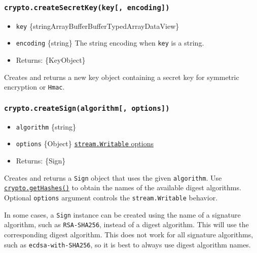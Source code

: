 \subsubsection{\texorpdfstring{\texttt{crypto.createSecretKey(key{[},\ encoding{]})}}{crypto.createSecretKey(key{[}, encoding{]})}}\label{crypto.createsecretkeykey-encoding}

\begin{itemize}
\tightlist
\item
  \texttt{key}
  \{string\textbar ArrayBuffer\textbar Buffer\textbar TypedArray\textbar DataView\}
\item
  \texttt{encoding} \{string\} The string encoding when \texttt{key} is
  a string.
\item
  Returns: \{KeyObject\}
\end{itemize}

Creates and returns a new key object containing a secret key for
symmetric encryption or \texttt{Hmac}.

\subsubsection{\texorpdfstring{\texttt{crypto.createSign(algorithm{[},\ options{]})}}{crypto.createSign(algorithm{[}, options{]})}}\label{crypto.createsignalgorithm-options}

\begin{itemize}
\tightlist
\item
  \texttt{algorithm} \{string\}
\item
  \texttt{options} \{Object\}
  \href{stream.md\#new-streamwritableoptions}{\texttt{stream.Writable}
  options}
\item
  Returns: \{Sign\}
\end{itemize}

Creates and returns a \texttt{Sign} object that uses the given
\texttt{algorithm}. Use
\hyperref[cryptogethashes]{\texttt{crypto.getHashes()}} to obtain the
names of the available digest algorithms. Optional \texttt{options}
argument controls the \texttt{stream.Writable} behavior.

In some cases, a \texttt{Sign} instance can be created using the name of
a signature algorithm, such as
\texttt{\textquotesingle{}RSA-SHA256\textquotesingle{}}, instead of a
digest algorithm. This will use the corresponding digest algorithm. This
does not work for all signature algorithms, such as
\texttt{\textquotesingle{}ecdsa-with-SHA256\textquotesingle{}}, so it is
best to always use digest algorithm names.

